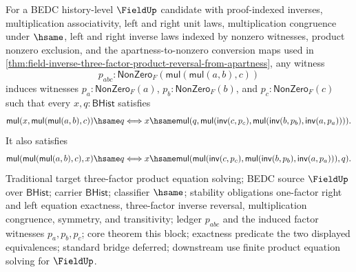 \begin{theorem}
\label{thm:field-three-factor-product-equation-exact-from-apartness}
For a BEDC history-level $\FieldUp$ candidate with proof-indexed inverses,
multiplication associativity, left and right unit laws, multiplication
congruence under $\hsame$, left and right inverse laws indexed by nonzero
witnesses, product nonzero exclusion, and the apartness-to-nonzero conversion
maps used in
\autoref{thm:field-inverse-three-factor-product-reversal-from-apartness}, any
witness
$$
p_{abc}:\mathsf{NonZero}_F(\mathsf{mul}(\mathsf{mul}(a,b),c))
$$
induces witnesses $p_a:\mathsf{NonZero}_F(a)$,
$p_b:\mathsf{NonZero}_F(b)$, and $p_c:\mathsf{NonZero}_F(c)$ such that every
$x,q:\mathsf{BHist}$ satisfies
$$
\mathsf{mul}(x,\mathsf{mul}(\mathsf{mul}(a,b),c))\hsame q
\Longleftrightarrow
x\hsame
\mathsf{mul}(q,\mathsf{mul}(\mathsf{inv}(c,p_c),
\mathsf{mul}(\mathsf{inv}(b,p_b),\mathsf{inv}(a,p_a)))).
$$
It also satisfies
$$
\mathsf{mul}(\mathsf{mul}(\mathsf{mul}(a,b),c),x)\hsame q
\Longleftrightarrow
x\hsame
\mathsf{mul}(\mathsf{mul}(\mathsf{inv}(c,p_c),
\mathsf{mul}(\mathsf{inv}(b,p_b),\mathsf{inv}(a,p_a))),q).
$$
Traditional target three-factor product equation solving; BEDC source
$\FieldUp$ over $\mathsf{BHist}$; carrier $\mathsf{BHist}$; classifier
$\hsame$; stability obligations one-factor right and left equation exactness,
three-factor inverse reversal, multiplication congruence, symmetry, and
transitivity; ledger $p_{abc}$ and the induced factor witnesses
$p_a,p_b,p_c$; core theorem this block; exactness predicate the two displayed
equivalences; standard bridge deferred; downstream use finite product equation
solving for $\FieldUp$.
\end{theorem}

